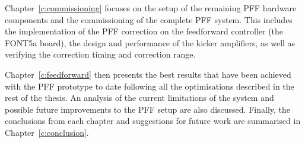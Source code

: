 Chapter~\ref{c:commissioning} focuses on the setup of the remaining PFF hardware components and the commissioning of the complete PFF system. This includes the implementation of the PFF correction on the feedforward controller (the FONT5a board), the design and performance of the kicker amplifiers, as well as verifying the correction timing and correction range.

Chapter~\ref{c:feedforward} then presents the best results that have been achieved with the PFF prototype to date following all the optimisations described in the rest of the thesis. An analysis of the current limitations of the system and possible future improvements to the PFF setup are also discussed. Finally, the conclusions from each chapter and suggestions for future work are summarised in Chapter~\ref{c:conclusion}.


